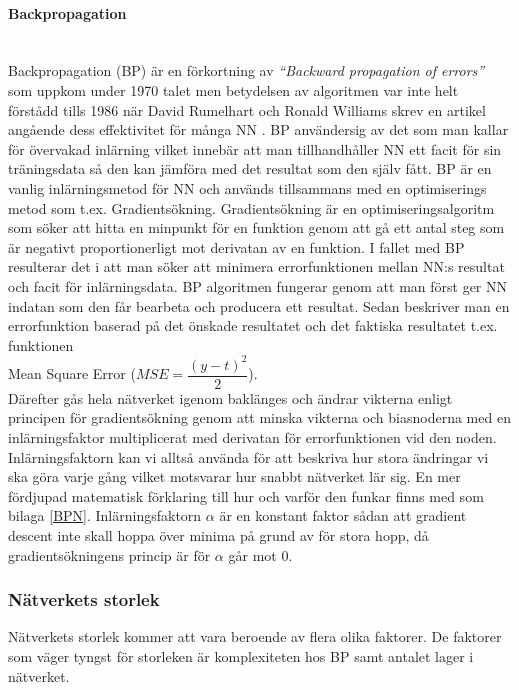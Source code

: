 \documentclass[a4paper,10pt]{article}
\begin{document}
\paragraph{Backpropagation}\hspace{0pt}\\
Backpropagation (BP) är en förkortning av \emph{``Backward propagation of errors''} \autocite{BP} som uppkom under 1970 talet men betydelsen av algoritmen var inte helt förstådd tills 1986 när David Rumelhart och Ronald Williams skrev en artikel angående dess effektivitet för många NN \autocite{NNDL}. BP användersig av det som man kallar för övervakad inlärning vilket innebär att man tillhandhåller NN ett facit för sin träningsdata så den kan jämföra med det resultat som den själv fått. BP är en vanlig inlärningsmetod för NN och används tillsammans med en optimiserings metod som t.ex. Gradientsökning. Gradientsökning är en optimiseringsalgoritm som söker att hitta en minpunkt för en funktion genom att gå ett antal steg som är negativt proportionerligt mot derivatan av en funktion\autocite{GD}. I fallet med BP resulterar det i att man söker att minimera errorfunktionen mellan NN:s resultat och facit för inlärningsdata. 
BP algoritmen fungerar genom att man först ger NN indatan som den får bearbeta och producera ett resultat. Sedan beskriver man en errorfunktion baserad på det önskade resultatet och det faktiska resultatet t.ex. funktionen \\Mean Square Error ($MSE = \dfrac{(y-t)^2}{2}$). \\Därefter gås hela nätverket igenom baklänges och ändrar vikterna enligt principen för gradientsökning genom att minska vikterna och biasnoderna med en inlärningsfaktor multiplicerat med derivatan för errorfunktionen vid den noden. Inlärningsfaktorn kan vi alltså använda för att beskriva hur stora ändringar vi ska göra varje gång vilket motsvarar hur snabbt nätverket lär sig. En mer fördjupad matematisk förklaring till hur och varför den funkar finns med som bilaga \ref{BPN}. Inlärningsfaktorn $\alpha$ är en konstant faktor sådan att gradient descent inte skall hoppa över minima på grund av för stora hopp, då gradientsökningens princip är för $\alpha$ går mot 0.


\subsubsection{Nätverkets storlek}
Nätverkets storlek kommer att vara beroende av flera olika faktorer. De faktorer som väger tyngst för storleken är komplexiteten hos BP samt antalet lager i nätverket.
\end{document}
